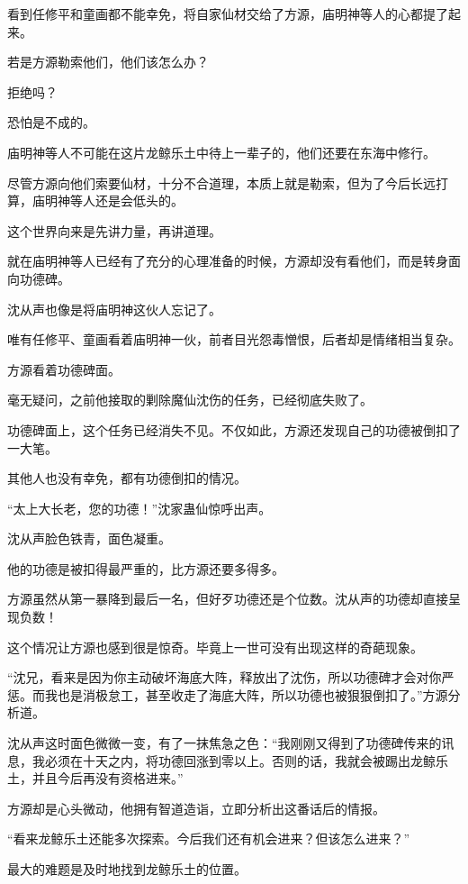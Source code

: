 
\begin{this_body}

看到任修平和童画都不能幸免，将自家仙材交给了方源，庙明神等人的心都提了起来。

若是方源勒索他们，他们该怎么办？

拒绝吗？

恐怕是不成的。

庙明神等人不可能在这片龙鲸乐土中待上一辈子的，他们还要在东海中修行。

尽管方源向他们索要仙材，十分不合道理，本质上就是勒索，但为了今后长远打算，庙明神等人还是会低头的。

这个世界向来是先讲力量，再讲道理。

就在庙明神等人已经有了充分的心理准备的时候，方源却没有看他们，而是转身面向功德碑。

沈从声也像是将庙明神这伙人忘记了。

唯有任修平、童画看着庙明神一伙，前者目光怨毒憎恨，后者却是情绪相当复杂。

方源看着功德碑面。

毫无疑问，之前他接取的剿除魔仙沈伤的任务，已经彻底失败了。

功德碑面上，这个任务已经消失不见。不仅如此，方源还发现自己的功德被倒扣了一大笔。

其他人也没有幸免，都有功德倒扣的情况。

“太上大长老，您的功德！”沈家蛊仙惊呼出声。

沈从声脸色铁青，面色凝重。

他的功德是被扣得最严重的，比方源还要多得多。

方源虽然从第一暴降到最后一名，但好歹功德还是个位数。沈从声的功德却直接呈现负数！

这个情况让方源也感到很是惊奇。毕竟上一世可没有出现这样的奇葩现象。

“沈兄，看来是因为你主动破坏海底大阵，释放出了沈伤，所以功德碑才会对你严惩。而我也是消极怠工，甚至收走了海底大阵，所以功德也被狠狠倒扣了。”方源分析道。

沈从声这时面色微微一变，有了一抹焦急之色：“我刚刚又得到了功德碑传来的讯息，我必须在十天之内，将功德回涨到零以上。否则的话，我就会被踢出龙鲸乐土，并且今后再没有资格进来。”

方源却是心头微动，他拥有智道造诣，立即分析出这番话后的情报。

“看来龙鲸乐土还能多次探索。今后我们还有机会进来？但该怎么进来？”

最大的难题是及时地找到龙鲸乐土的位置。


\end{this_body}
